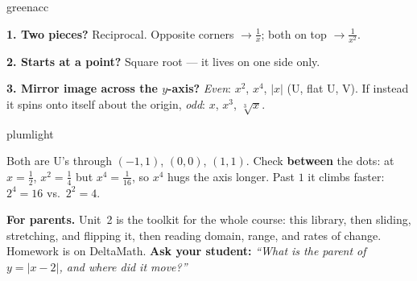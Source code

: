 \documentclass[12pt]{article}
\begin{document}
\vspace{0.04in}
\noindent
\begin{minipage}[t]{0.56\linewidth}\vspace{0pt}
\begin{scenariobox}{greenacc}
\small\raggedright
\textbf{1. Two pieces?} Reciprocal. Opposite corners $\to \frac{1}{x}$; both on top
$\to \frac{1}{x^2}$.\par\vspace{3pt}
\textbf{2. Starts at a point?} Square root --- it lives on one side only.\par\vspace{3pt}
\textbf{3. Mirror image across the $y$-axis?} \emph{Even}: $x^2$, $x^4$, $|x|$ (U, flat U,
V). If instead it spins onto itself about the origin, \emph{odd}: $x$, $x^3$, $\sqrt[3]{x}$.
\end{scenariobox}
\end{minipage}\hfill
\begin{minipage}[t]{0.42\linewidth}\vspace{0pt}
\begin{scenariobox}{plumlight}
\small\raggedright
Both are U's through $(-1,1)$, $(0,0)$, $(1,1)$. Check \textbf{between} the dots: at
$x=\frac{1}{2}$, $x^2=\frac{1}{4}$ but $x^4=\frac{1}{16}$, so $x^4$ hugs the axis longer.
Past $1$ it climbs faster: $2^4=16$ vs.\ $2^2=4$.
\end{scenariobox}
\end{minipage}

\vspace{0.04in}
\begin{remindbox}
\small
\textbf{For parents.} Unit~2 is the toolkit for the whole course: this library, then
sliding, stretching, and flipping it, then reading domain, range, and rates of change.
Homework is on DeltaMath. \textbf{Ask your student:} \emph{``What is the parent of
$y = |x - 2|$, and where did it move?''}
\end{remindbox}
\end{document}
